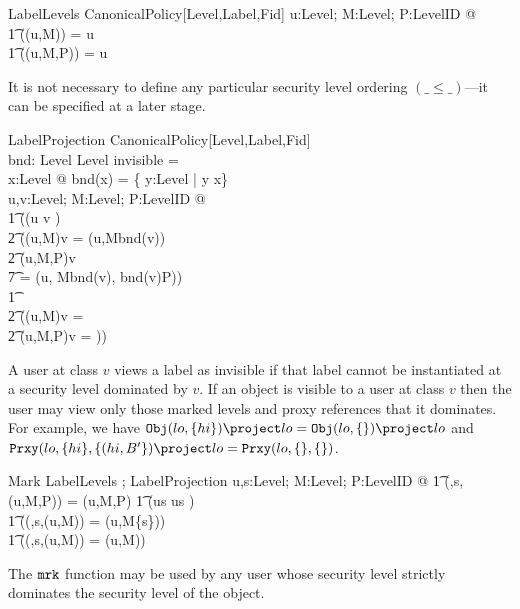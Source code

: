 \begin{schema}{LabelLevels}
CanonicalPolicy[Level,Label,Fid]
\where
\forall u:Level; M:\power Level; P:Level\pfun ID @ 
\\
\t1 \lev(\Object(u,M)) = u \land {}\\
\t1 \lev(\Proxy(u,M,P)) = u
\end{schema}
It is not necessary to define any particular security 
level ordering $(\_\leq\_)$---it can be specified at a later stage.
%
\newcommand{\bound}{bnd}
\begin{schema}{LabelProjection}
CanonicalPolicy[Level,Label,Fid] \\
\bound : Level \fun \power Level 
\where
invisible = \Invisible 
\\
\forall x:Level @ \bound(x) =  \{ y:Level | y \fleq x\}
\\
\forall u,v:Level; M:\power Level; P:Level\pfun ID @ \\
\t1 (\IF (u \fleq v ) \THEN 
\\
\t2 (\Object(u,M)\lproj v = \Object(u,M\cap \bound(v)) \land \\
\t2  \Proxy(u,M,P)\lproj v \\ 
\t7 = \Proxy(u, M\cap \bound(v), \bound(v)\dres P))\\
\t1 \ELSE
\\
\t2 (\Object(u,M)\lproj v = \Invisible \land\\
\t2 \Proxy(u,M,P)\lproj v = \Invisible))
\end{schema}
A user at class $v$ views  a label as invisible if 
that label cannot be instantiated at a security level dominated by $v$. 
If an object is visible to a user at class $v$ 
then the user may view only those marked levels and proxy references
that it dominates. 
For example,  
we have $\Object(lo,\{hi\})\lproj lo = \Object(lo,\{\})\lproj lo$ and
$\Proxy(lo,\{hi\},\{(hi,B'\})\lproj lo= \Proxy(lo,\{\},\{\})$. 


\begin{schema}{Mark}
LabelLevels ; LabelProjection
\where
\forall u,s:Level; M:\power Level; P:Level\pfun ID @ 
\also
\t1 \Rfun(\marku,s,\Proxy(u,M,P)) = \Proxy(u,M,P) \land 
\also
\t1 \IF (u\fleq s \land u\neq s ) \\
\t1 \THEN (\Rfun(\marku,s,\Object(u,M)) = \Object(u,M\cup\{s\}))\\
\t1 \ELSE (\Rfun(\marku,s,\Object(u,M)) = \Object(u,M)) 
\end{schema}
The $\mbox{\tt mrk}$ function may be used by any user whose security level strictly 
dominates the security level of the object.  

